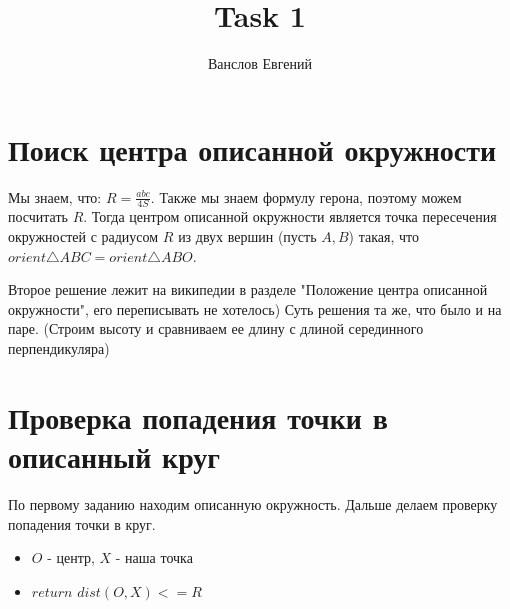 \documentclass[14pt]{article} %
\title{Task 1}
\author{Ванслов Евгений}
\date{}
\begin{document}
\maketitle
\section{Поиск центра описанной окружности}

Мы знаем, что: $R=\frac{abc}{4S}$.
Также мы знаем формулу герона, поэтому можем посчитать $R$.
Тогда центром описанной окружности является точка пересечения окружностей с радиусом $R$ из двух вершин (пусть $A,B$) такая, что $orient\triangle ABC= orient\triangle ABO$.  

Второе решение лежит на википедии в разделе "Положение центра описанной окружности", его переписывать не хотелось)
Суть решения та же, что было и на паре. (Строим высоту и сравниваем ее длину с длиной серединного перпендикуляра)

\section{Проверка попадения точки в описанный круг}
По первому заданию находим описанную окружность.
Дальше делаем проверку попадения точки в круг.

\begin{itemize}
\item $O$ - центр, $X$ - наша точка
\item $return$ $dist( O, X) <= R $
\end{itemize}

  
\end{document}
